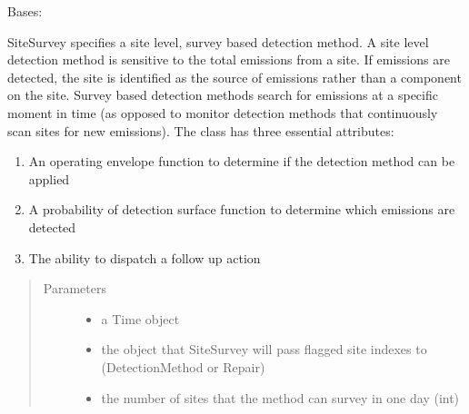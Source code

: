 \documentclass[letterpaper,10pt,english]{sphinxmanual}
\begin{document}
\begin{fulllineitems}
\label{\detokenize{index:feast.DetectionModules.site_survey.SiteSurvey}}
Bases: {\hyperref[\detokenize{index:feast.DetectionModules.abstract_detection_method.DetectionMethod}]{}}

SiteSurvey specifies a site level, survey based detection method. A site level detection method is sensitive to
the total emissions from a site. If emissions are detected, the site is identified as the source of emissions
rather than a component on the site. Survey based detection methods search for emissions at a specific moment in
time (as opposed to monitor detection methods that continuously scan sites for new emissions).
The class has three essential attributes:
\begin{enumerate}
%
\item {} 
An operating envelope function to determine if the detection method can be applied

\item {} 
A probability of detection surface function to determine which emissions are detected

\item {} 
The ability to dispatch a follow up action

\end{enumerate}
\begin{quote}\begin{description}
\item[{Parameters}] \leavevmode\begin{itemize}
\item {} 
 \textendash{} a Time object

\item {} 
 \textendash{} the object that SiteSurvey will pass flagged site indexes to (DetectionMethod or Repair)

\item {} 
 \textendash{} the number of sites that the method can survey in one day (int)


\end{itemize}
\end{description}
\end{quote}
\end{fulllineitems}
\end{document}
